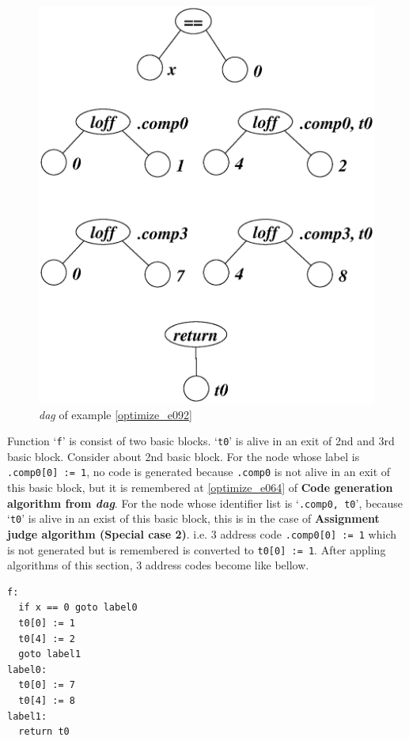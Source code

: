 \begin{Example}
\begin{figure}[htbp]
\begin{center}
\begin{latexonly}
\includegraphics[width=0.857\linewidth,height=1.0\linewidth]{opt040.eps}
\end{latexonly}
\caption{{\em dag} of example \ref{optimize_e092}}
\label{optimize_e093}
\end{center}
\end{figure}
Function `{\tt{f}}' is consist of two basic blocks.
`{\tt{t0}}' is
alive in an exit of 2nd and 3rd basic block.
Consider about 2nd basic block.
For the node whose label is {\tt{.comp0[0] := 1}},
no code is generated because {\tt{.comp0}} is not alive
in an exit of this basic block, but it is remembered 
at \ref{optimize_e064} of
{\bf Code generation algorithm from {\em dag}}.
For the node whose identifier list is `{\tt{.comp0, t0}}',
because `{\tt{t0}}' is alive in an exist of this basic block,
this is in the case of {\bf Assignment judge algorithm (Special case 2)}.
i.e. 3 address code {\tt{.comp0[0] := 1}} which is not generated
but is remembered is converted to {\tt{t0[0] := 1}}.
After appling algorithms of this section,
3 address codes become like bellow.
\begin{verbatim}
f:
  if x == 0 goto label0
  t0[0] := 1
  t0[4] := 2
  goto label1
label0:
  t0[0] := 7
  t0[4] := 8
label1:
  return t0
\end{verbatim}
\end{Example}

